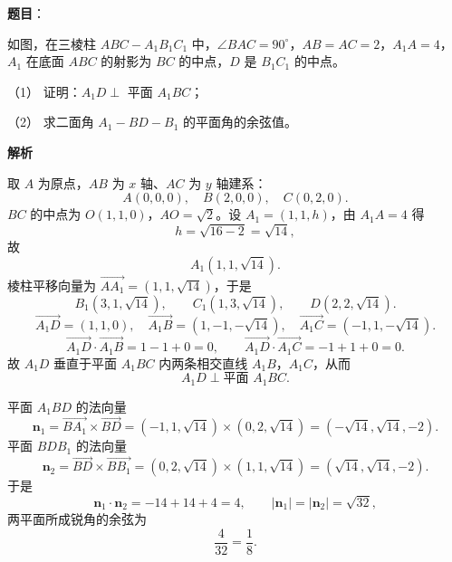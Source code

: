 \begin{answer}

\textbf{题目}：

如图，在三棱柱 \(ABC-A_1B_1C_1\) 中，\(\angle BAC=90^\circ\)，\(AB=AC=2\)，\(A_1A=4\)，\(A_1\) 在底面 \(ABC\) 的射影为 \(BC\) 的中点，\(D\) 是 \(B_1C_1\) 的中点。

（1） 证明：\(A_1D\perp\) 平面 \(A_1BC\)；

（2） 求二面角 \(A_1-BD-B_1\) 的平面角的余弦值。
\nopagebreak[4]
\begin{center}\end{center}
\nopagebreak[4]
\textbf{解析}


取 \(A\) 为原点，\(AB\) 为 \(x\) 轴、\(AC\) 为 \(y\) 轴建系：
\nopagebreak[4]
\[
A(0,0,0),\quad B(2,0,0),\quad C(0,2,0).
\]
\(BC\) 的中点为 \(O(1,1,0)\)，\(AO=\sqrt2\)。设 \(A_1=(1,1,h)\)，由 \(A_1A=4\) 得
\nopagebreak[4]
\[
h=\sqrt{16-2}=\sqrt{14},
\]
故
\nopagebreak[4]
\[
A_1(1,1,\sqrt{14}).
\]
棱柱平移向量为 \(\overrightarrow{AA_1}=(1,1,\sqrt{14})\)，于是
\nopagebreak[4]
\[
B_1(3,1,\sqrt{14}),\qquad C_1(1,3,\sqrt{14}),\qquad D(2,2,\sqrt{14}).
\]
\nopagebreak[4]
\[
\overrightarrow{A_1D}=(1,1,0),\quad
\overrightarrow{A_1B}=(1,-1,-\sqrt{14}),\quad
\overrightarrow{A_1C}=(-1,1,-\sqrt{14}).
\]
\nopagebreak[4]
\[
\overrightarrow{A_1D}\cdot\overrightarrow{A_1B}=1-1+0=0,\qquad
\overrightarrow{A_1D}\cdot\overrightarrow{A_1C}=-1+1+0=0.
\]
故 \(A_1D\) 垂直于平面 \(A_1BC\) 内两条相交直线 \(A_1B\)，\(A_1C\)，从而
\nopagebreak[4]
\[
A_1D\perp\text{平面 }A_1BC.
\]


平面 \(A_1BD\) 的法向量
\nopagebreak[4]
\[
\boldsymbol{n}_1=\overrightarrow{BA_1}\times\overrightarrow{BD}
=(-1,1,\sqrt{14})\times(0,2,\sqrt{14})
=(-\sqrt{14},\sqrt{14},-2).
\]
平面 \(BDB_1\) 的法向量
\nopagebreak[4]
\[
\boldsymbol{n}_2=\overrightarrow{BD}\times\overrightarrow{BB_1}
=(0,2,\sqrt{14})\times(1,1,\sqrt{14})
=(\sqrt{14},\sqrt{14},-2).
\]
于是
\nopagebreak[4]
\[
\boldsymbol{n}_1\cdot\boldsymbol{n}_2=-14+14+4=4,\qquad
|\boldsymbol{n}_1|=|\boldsymbol{n}_2|=\sqrt{32},
\]
两平面所成锐角的余弦为
\nopagebreak[4]
\[
\frac{4}{32}=\frac18.
\]


\end{answer}
